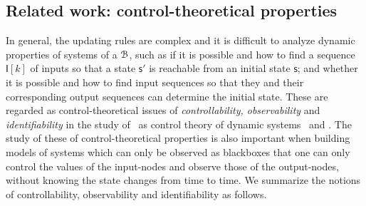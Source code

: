 

\subsection{Related work: control-theoretical properties}
 In general, the updating rules are complex and it is difficult to analyze dynamic properties of systems of a {\BCN} ${\mathcal{B}}$, such as if it is possible and how to  find a sequence $\mathsf{I}[k]$ of inputs so that a state $\mathsf{s}'$ is reachable from an initial state $\mathsf{s}$;  and whether it is possible and how to find input sequences so that  they and their corresponding output sequences can  determine the initial state.  These are regarded as control-theoretical issues of {\em controllability, observability} and {\em identifiability} in the study of \BCNs\ as  control theory of dynamic systems~\cite{Akutsu2007Control,cheng2009controllability, Zhao2010Input, Cheng2011Identification, Cheng2011Analysis} and \cite{Fornasini2013Observability}.
The study  of these of control-theoretical properties is also important when building {\BCN} models of systems which can only be observed as blackboxes that one can only  control the  values of  the input-nodes and observe those of the output-nodes, without knowing  the state changes  from time to time.   We summarize  the notions of controllability, observability and  identifiability as follows.
  
